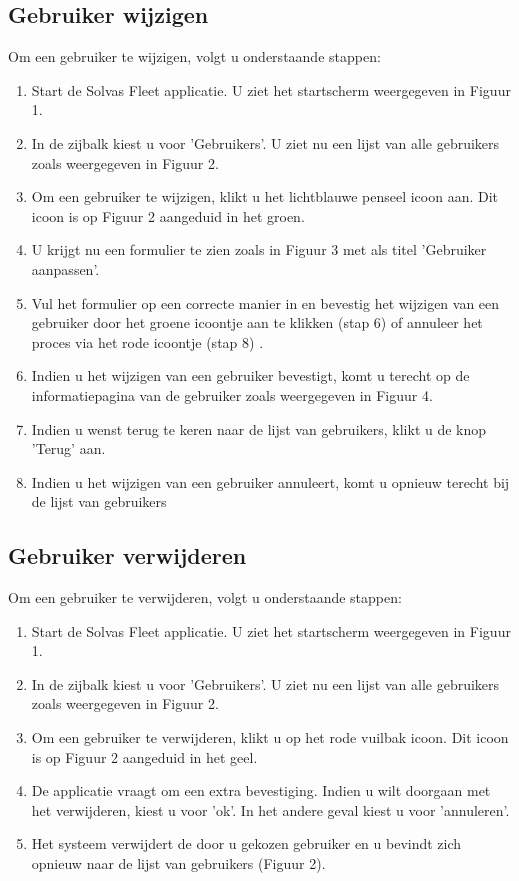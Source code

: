 \documentclass[11pt,openany]{article}
\begin{document}
\subsection{Gebruiker wijzigen}
Om een gebruiker te wijzigen, volgt u onderstaande stappen:
\begin{enumerate}
	\item Start de Solvas Fleet applicatie. U ziet het startscherm weergegeven in Figuur 1.
	\item In de zijbalk kiest u voor 'Gebruikers'. U ziet nu een lijst van alle gebruikers zoals weergegeven in Figuur 2.
	\item Om een gebruiker te wijzigen, klikt u het lichtblauwe penseel icoon aan. Dit icoon is op Figuur 2 aangeduid in het groen.
	\item U krijgt nu een formulier te zien zoals in Figuur 3 met als titel 'Gebruiker aanpassen'.
	\item Vul het formulier op een correcte manier in en bevestig het wijzigen van een gebruiker door het groene icoontje aan te klikken (stap 6) of annuleer het proces via het rode icoontje (stap 8) .
	\item Indien u het wijzigen van een gebruiker bevestigt, komt u terecht op de informatiepagina van de gebruiker zoals weergegeven in Figuur 4. 
	\item Indien u wenst terug te keren naar de lijst van gebruikers, klikt u de knop 'Terug' aan.
	\item Indien u het wijzigen van een gebruiker annuleert, komt u opnieuw terecht bij de lijst van gebruikers 
\end{enumerate}

\subsection{Gebruiker verwijderen}
Om een gebruiker te verwijderen, volgt u onderstaande stappen:
\begin{enumerate}
	\item Start de Solvas Fleet applicatie. U ziet het startscherm weergegeven in Figuur 1.
	\item In de zijbalk kiest u voor 'Gebruikers'. U ziet nu een lijst van alle gebruikers zoals weergegeven in Figuur 2.
	\item Om een gebruiker te verwijderen, klikt u op het rode vuilbak icoon. Dit icoon is op Figuur 2 aangeduid in het geel.
	\item De applicatie vraagt om een extra bevestiging. Indien u wilt doorgaan met het verwijderen, kiest u voor 'ok'. In het andere geval kiest u voor 'annuleren'.
	\item Het systeem verwijdert de door u gekozen gebruiker en u bevindt zich opnieuw naar de lijst van gebruikers (Figuur 2).
\end{enumerate}
\newpage
\end{document}
